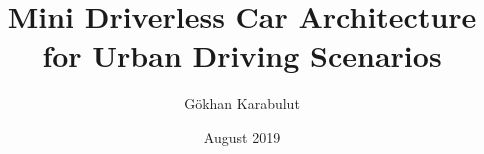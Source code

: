 \documentclass[chaparabic,ceng,ms,12pt,oneandhalf]{metu}
\author{Gökhan Karabulut}
\title{Mini Driverless Car Architecture for Urban Driving Scenarios}
\date{August 2019}
\begin{document}
\begin{preliminaries}


\end{preliminaries}
%
%
%

\setlength{\parindent}{0em}
\setlength{\parskip}{10pt}












%
%

%

% 
\end{document}
